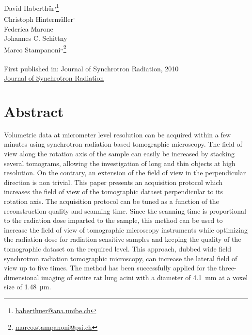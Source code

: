 \label{ch:Haberthuer2010}

David Haberthür\textsuperscript{,}\footnote{\href{mailto:haberthuer@ana.unibe.ch}{haberthuer@ana.unibe.ch}}\\
Christoph Hintermüller\textsuperscript{,}\\
Federica Marone\\
Johannes C. Schittny\\
Marco Stampanoni\textsuperscript{,}\textsuperscript{,}\footnote{\href{mailto:marco.stampanoni@psi.ch}{marco.stampanoni@psi.ch}}\\\\
First published in: Journal of Synchrotron Radiation, 2010\\
\href{http://journals.iucr.org/s/}{Journal of Synchrotron Radiation}

\section{Abstract}
Volumetric data at micrometer level resolution can be acquired within a few minutes using synchrotron radiation based tomographic microscopy. The field of view along the rotation axis of the sample can easily be increased by stacking several tomograms, allowing  the investigation of long and thin objects at high resolution. On the contrary, an extension of the field of view in the perpendicular direction is non trivial. This paper presents an acquisition protocol which increases the field of view of the tomographic dataset perpendicular to its rotation axis. The acquisition protocol can be tuned as a function of the reconstruction quality and scanning time. Since the scanning time is proportional to the radiation dose imparted to the sample, this method can be used to increase the field of view of tomographic microscopy instruments while optimizing the radiation dose for radiation sensitive samples and keeping the quality of the tomographic dataset on the required level. This approach, dubbed wide field synchrotron radiation tomographic microscopy, can increase the lateral field of view up to five times. The method has been successfully applied for the three-dimensional imaging of entire rat lung acini with a diameter of \SI{4.1}{\milli\meter} at a voxel size of \SI{1.48}{\micro\meter}.

